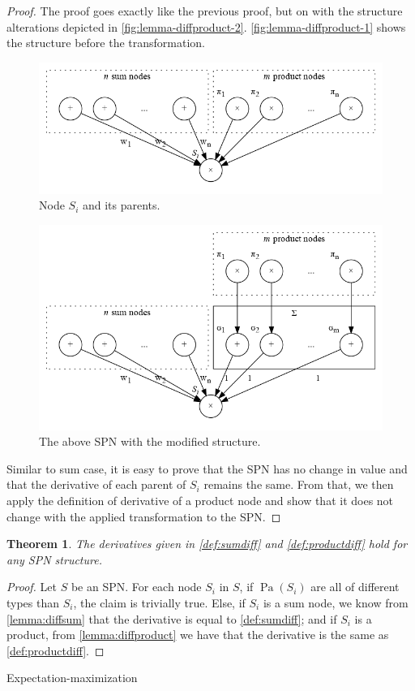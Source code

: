 \documentclass{amsart}
\makeatletter
\def\subsection{\@startsection{subsection}{3}%
  \z@{.5\linespacing\@plus.7\linespacing}{.1\linespacing}%
  {\normalfont}}
\DeclareMathOperator*{\Pa}{\text{Pa}}
\theoremstyle{plain}
\newcounter{dummy-def}\numberwithin{dummy-def}{section}
\newcounter{dummy-thm}\numberwithin{dummy-thm}{section}
\newtheorem{theorem}[dummy-thm]{Theorem}
\newcounter{dummy-prop}\numberwithin{dummy-prop}{section}
\newcounter{dummy-corollary}\numberwithin{dummy-corollary}{section}
\newcounter{dummy-lemma}\numberwithin{dummy-lemma}{section}
\newcounter{dummy-ex}\numberwithin{dummy-ex}{section}
\newcounter{dummy-eg}\numberwithin{dummy-eg}{section}
\numberwithin{equation}{section}
\makeatother
\begin{document}
\begin{proof}
  The proof goes exactly like the previous proof, but on with the structure alterations depicted in
  \autoref{fig:lemma-diffproduct-2}. \autoref{fig:lemma-diffproduct-1} shows the structure before
  the transformation.
  \begin{figure}[h]
    \centering\includegraphics[scale=0.5]{graphs/lemma-diffproduct-1.png}
    \caption{Node $S_i$ and its parents.}\label{fig:lemma-diffproduct-1}
  \end{figure}
  \begin{figure}[h]
    \centering\includegraphics[scale=0.5]{graphs/lemma-diffproduct-2.png}
    \caption{The above SPN with the modified structure.}\label{fig:lemma-diffproduct-2}
  \end{figure}
  Similar to sum case, it is easy to prove that the SPN has no change in value and that the
  derivative of each parent of $S_i$ remains the same. From that, we then apply the definition of
  derivative of a product node and show that it does not change with the applied transformation to
  the SPN\@.
\end{proof}

\begin{theorem} The derivatives given in \autoref{def:sumdiff} and \autoref{def:productdiff}
  hold for any SPN structure.
\end{theorem}
\begin{proof}
  Let $S$ be an SPN\@. For each node $S_i$ in $S$, if $\Pa(S_i)$ are all of different types than
  $S_i$, the claim is trivially true. Else, if $S_i$ is a sum node, we know from
  \autoref{lemma:diffsum} that the derivative is equal to \autoref{def:sumdiff}; and if $S_i$ is a
  product, from \autoref{lemma:diffproduct} we have that the derivative is the same as
  \autoref{def:productdiff}.
\end{proof}

\subsection{Expectation-maximization}


\printbibliography[]
\end{document}
